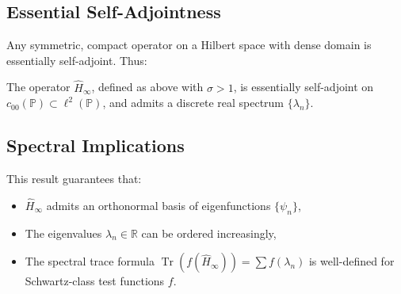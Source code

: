 \subsection*{Essential Self-Adjointness}
Any symmetric, compact operator on a Hilbert space with dense domain is essentially self-adjoint. Thus:

\begin{theorem}
The operator \( \hat{H}_\infty \), defined as above with \( \sigma > 1 \), is essentially self-adjoint on \( c_{00}(\mathbb{P}) \subset \ell^2(\mathbb{P}) \), and admits a discrete real spectrum \( \{\lambda_n\} \).
\end{theorem}

\subsection*{Spectral Implications}
This result guarantees that:
\begin{itemize}
  \item \( \hat{H}_\infty \) admits an orthonormal basis of eigenfunctions \( \{\psi_n\} \),
  \item The eigenvalues \( \lambda_n \in \mathbb{R} \) can be ordered increasingly,
  \item The spectral trace formula \( \operatorname{Tr}(f(\hat{H}_\infty)) = \sum f(\lambda_n) \) is well-defined for Schwartz-class test functions \( f \).
\end{itemize}